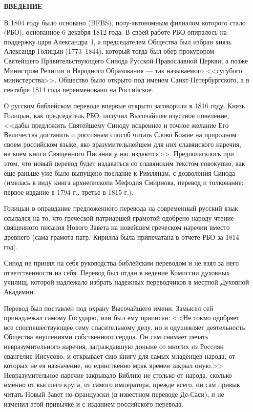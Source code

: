 \pagestyle{fancy}
\thispagestyle{empty}
\begin{center}
\Large\bfseries ВВЕДЕНИЕ\\
\end{center}
\fontsize{14}{16}\selectfont

В 1804 году было основано  (BFBS),
полу-автономным филиалом которого стало  (РБО),
основанное 6 декабря 1812 года.
В своей работе РБО опиралось на поддержку царя Александра~I, а председателем Общества
был избран князь Александр Голицын (1773--1844),
который тогда был обер-прокурором Святейшего Правительствующего Синода
Русской Православной Церкви, а позже Министром Религии и Народного Образования ---
так называемого <<сугубого министерства>>.
Общество было открыто под именем Санкт-Петербургского, а в сентябре 1814 года
переименовано на Российское.

О русском библейском переводе впервые открыто заговорили в 1816 году.
Князь Голицын, как председатель РБО, получил Высочайшее изустное повеление,
<<дабы предложить Святейшему Синоду искреннее и точное желание Его Величества
доставить и россиянам способ читать Слово Божие на природном своем российском
языке, яко вразумительнейшем для них славянского наречия, на коем книги
Священного Писания у нас издаются>>.
Предполагалось при этом, что новый перевод будет издаваться со славянским
текстом совокупно, как еще раньше уже было выпущено послание к Римлянам,
с дозволения Синода (имелась в виду книга архиепископа Мефодия Смирнова,
перевод и толкование; первое издание в 1794 г., третье в 1815 г.).

Голицын в оправдание предложенного перевода на современный русский язык
ссылался на то, что греческой патриаршей грамотой одобрено народу
чтение священного писания Нового Завета на новейшем греческом наречии
вместо древнего (сама грамота патр. Кирилла была припечатана в отчете
РБО за 1814 год).

Синод не принял на себя руководства библейским переводом и не взял за
него ответственности на себя.
Перевод был отдан в ведение Комиссии духовных училищ, которой надлежало
избрать надежных переводчиков в местной Духовной Академии. 

Перевод был поставлен под охрану Высочайшего имени.
Замысел сей принадлежал самому Государю, или был ему приписан:
<<Не токмо одобряет все споспешествующее сему спасительному делу, но и
одушевляет деятельность Общества внушениями собственного сердца.
Он сам снимает печать невразумительного наречия, заграждавшую доныне от
многих из Россиян евангелие Иисусово, и открывает сию книгу для самых
младенцев народа, от которых не ея назначение, но единственно мрак
времен закрыл оную.>>
Невразумительное наречие закрывало Библию не столько
от народа, сколько именно от высшего круга, от самого императора, прежде
всего, он сам привык читать Новый Завет по-французски (в известном
переводе Де-Саси), и не изменил этой привычке и с изданием российского
перевода.

